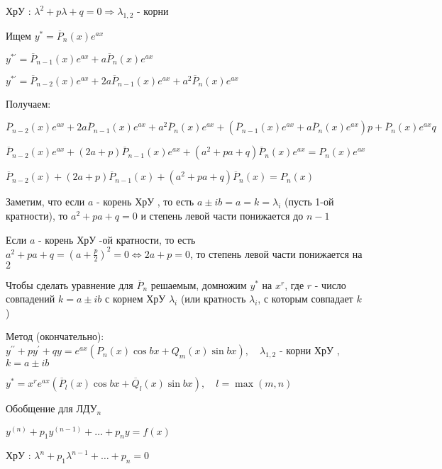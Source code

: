 \documentclass[12pt]{article}
\begin{document}
    ХрУ \Cat: $\lambda^2 + p\lambda + q = 0 \Longrightarrow \lambda_{1,2}$ - корни

    \vspace{5mm}
    Ищем $y^* = \overline{P}_n(x) e^{ax}$

    $y^{*\prime} = \overline{P}_{n - 1} (x) e^{ax} + a\overline{P}_n(x) e^{ax}$

    $y^{*\prime} = \overline{P}_{n - 2} (x) e^{ax} + 2a\overline{P}_{n - 1} (x) e^{ax} + a^2\overline{P}_n(x) e^{ax}$

    \vspace{5mm}
    Получаем:

    $\overline{P}_{n - 2} (x) e^{ax} + 2a\overline{P}_{n - 1} (x) e^{ax} + a^2\overline{P}_n(x) e^{ax} + (\overline{P}_{n - 1} (x) e^{ax} + a\overline{P}_n(x) e^{ax})p + \overline{P}_n(x) e^{ax} q $

    $\overline{P}_{n - 2} (x) e^{ax} + (2a + p)\overline{P}_{n - 1} (x) e^{ax} + (a^2 + pa + q)\overline{P}_n(x) e^{ax} = P_n(x) e^{ax}$

    $\overline{P}_{n - 2} (x) + (2a + p)\overline{P}_{n - 1} (x) + (a^2 + pa + q)\overline{P}_n(x) = P_n(x)$

    Заметим, что если $a$ - корень ХрУ \Cat, то есть $a \pm ib = a = k = \lambda_i$ (пусть 1-ой кратности), то $a^2 + pa + q = 0$ и степень
    левой части понижается до $n - 1$

    Если $a$ - корень ХрУ -ой кратности, то есть $a^2 + pa + q = \left(a + \frac{p}{2}\right)^2 = 0 \Longleftrightarrow 2a + p = 0$, то степень левой части понижается на $2$

    Чтобы сделать уравнение для $\overline{P}_n$ решаемым, домножим $y^*$ на $x^r$, где $r$ - число совпадений $k = a \pm ib$ с корнем ХрУ $\lambda_i$ (или кратность $\lambda_i$, с которым совпадает $k$)

    \vspace{5mm}
    Метод (окончательно): $y^{\prime\prime} + py^\prime + qy = e^{ax} (P_n(x)\cos bx + Q_m (x)\sin bx), \quad \lambda_{1,2}$ - корни ХрУ \Cat, $k = a \pm ib$

    $y^* = x^r e^{ax} (\overline{P}_l (x)\cos bx + \overline{Q}_l (x) \sin bx), \quad l = \max(m, n)$

    \vspace{5mm}
    Обобщение для ЛДУ$_n$

    $y^{(n)} + p_1 y^{(n - 1)} + \dots + p_n y = f(x)$

    ХрУ \Cat: $\lambda^n + p_1 \lambda^{n - 1} + \dots + p_n = 0$
\end{document}
